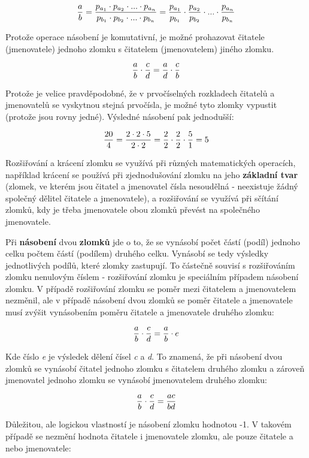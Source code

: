 $$ {a \over b } = {{p_{a_1} \cdot p_{a_2} \cdot  ... \cdot p_{a_n} }\over {p_{b_1} \cdot p_{b_2} \cdot  ... \cdot p_{b_n}}} = {p_{a_1}\over p_{b_1}} \cdot {p_{a_2} \over p_{b_2}} \cdot ... \cdot {p_{a_n} \over p_{b_n}}$$

Protože operace násobení je komutativní, je možné prohazovat čitatele (jmenovatele) jednoho zlomku s čitatelem (jmenovatelem) jiného zlomku.

$$ {a\over b } \cdot {c \over d} = {a\over d} \cdot {c \over b}$$

Protože je velice pravděpodobné, že v prvočíselných rozkladech čitatelů a jmenovatelů se vyskytnou stejná prvočísla, je možné tyto zlomky vypustit (protože jsou rovny jedné). Výsledné násobení pak jednodušší:

$$ {20 \over 4} = {{2\cdot 2 \cdot 5}\over {2\cdot 2}} = {2\over 2} \cdot {2\over 2} \cdot {5 \over 1} = 5  $$

Rozšiřování a krácení zlomku se využívá při různých matematických operacích, například krácení se používá při zjednodušování zlomku na jeho {\bf základní tvar} (zlomek, ve kterém jsou čitatel a jmenovatel čísla nesoudělná - neexistuje žádný společný dělitel čitatele a jmenovatele), a rozšiřování se využívá při sčítání zlomků, kdy je třeba jmenovatele obou zlomků převést na společného jmenovatele.


Při {\bf násobení} dvou {\bf zlomků} jde o to, že se vynásobí počet částí (podíl) jednoho celku počtem částí (podílem) druhého celku. Vynásobí se tedy výsledky jednotlivých podílů, které zlomky zastupují. To částečně souvisí s rozšiřováním zlomku nenulovým číslem - rozšiřování zlomku je speciálním případem násobení zlomku. V případě rozšiřování zlomku se poměr mezi čitatelem a jmenovatelem nezměnil, ale v případě násobení dvou zlomků se poměr čitatele a jmenovatele musí zvýšit vynásobením poměru čitatele a jmenovatele druhého zlomku:

$$ {a\over b} \cdot {c \over d} = {a \over b} \cdot e $$

Kde číslo {\it e} je výsledek dělení čísel {\it c} a {\it d}. To znamená, že při násobení dvou zlomků se vynásobí čitatel jednoho zlomku s čitatelem druhého zlomku a zároveň jmenovatel jednoho zlomku se vynásobí jmenovatelem druhého zlomku:

$$ {a\over b} \cdot {c\over d} = {ac \over bd}$$

Důležitou, ale logickou vlastností je násobení zlomku hodnotou -1. V takovém případě se nezmění hodnota čitatele i jmenovatele zlomku, ale pouze čitatele a nebo jmenovatele:

